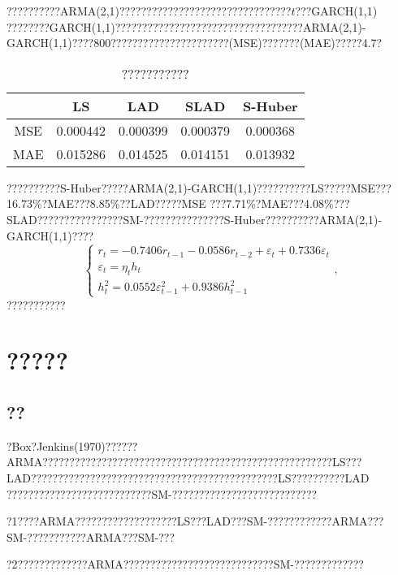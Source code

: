 \documentclass[a4paper,12pt,openany,oneside,utf-8]{ctexbook}
\begin{document}
	??????????ARMA(2,1)????????????????????????????????$t$???GARCH(1,1) ????????GARCH(1,1)???????????????????????????????????ARMA(2,1)-GARCH(1,1)????800??????????????????????(MSE)???????(MAE)?????4.7?
	\begin{center}
		\begin{table}[htb]
			\begin{center}
				\caption{???????????}
				\small{\begin{tabular}{ccccc}
						\hline    &   LS  &  LAD  & SLAD & S-Huber \\
						\hline MSE & 0.000442 & 0.000399 & 0.000379 & 0.000368 \\
						\hline MAE & 0.015286 & 0.014525 & 0.014151 & 0.013932 \\
						\hline
				\end{tabular}}
				\label{tab:size}
			\end{center}
		\end{table}
	\end{center}
	
	\newpage
	??????????S-Huber?????ARMA(2,1)-GARCH(1,1)??????????LS?????MSE???16.73\%?MAE???8.85\%??LAD?????MSE ???7.71\%?MAE???4.08\%???SLAD????????????????SM-???????????????S-Huber??????????ARMA(2,1)-GARCH(1,1)????
	$$
	\left\{\begin{array}{l}{r_{t}=-0.7406r_{t-1}-0.0586r_{t-2}+\varepsilon_t+0.7336\varepsilon_t} \\ {\varepsilon_{t}=\eta_{t} h_{t}} \\ {h_{t}^{2}=0.0552\varepsilon_{t-1}^{2}+0.9386 h_{t-1}^{2}}\end{array},\right.
	$$
	???????????
	
	\chapter[?????]{?????}
	\section{??}
	
	?Box?Jenkins(1970)??????ARMA??????????????????????????????????????????????????????LS???LAD??????????????????????????????????????????????LS??????????LAD ???????????????????????????SM-???????????????????????????
	
	?1????ARMA???????????????????LS???LAD???SM-????????????ARMA???SM-???????????ARMA???SM-???
	
	?2?????????????ARMA????????????????????????????SM-?????????????
	
\end{document}
